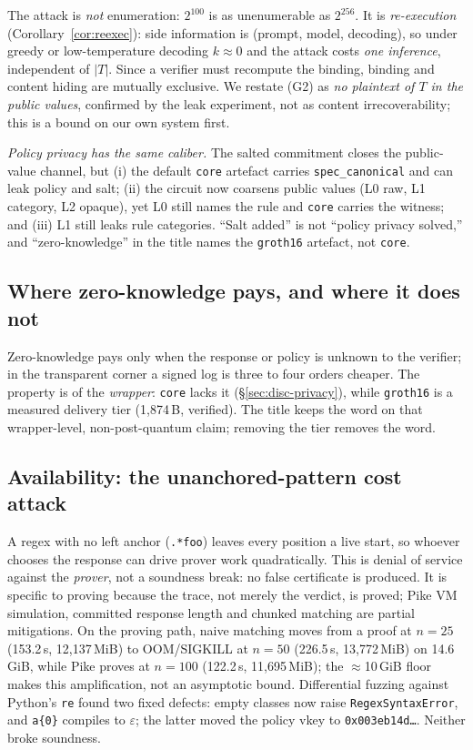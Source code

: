 \documentclass[10pt,journal,compsoc]{IEEEtran}
\begin{document}
The attack is \emph{not} enumeration: $2^{100}$ is as unenumerable as
$2^{256}$. It is \emph{re-execution} (Corollary~\ref{cor:reexec}): side
information is (prompt, model, decoding), so under greedy or low-temperature
decoding $k\approx0$ and the attack costs \emph{one inference}, independent of
$|T|$. Since a verifier must recompute the binding, binding and content hiding
are mutually exclusive. We restate (G2) as \emph{no plaintext of $T$ in the
public values}, confirmed by the leak experiment, not as content
irrecoverability; this is a bound on our own system first.

\emph{Policy privacy has the same caliber.} The salted commitment closes the
public-value channel, but (i) the default \texttt{core} artefact carries
\texttt{spec\_canonical} and can leak policy and salt; (ii) the circuit now
coarsens public values (L0 raw, L1 category, L2 opaque), yet L0 still names the
rule and \texttt{core} carries the witness; and (iii) L1 still leaks rule
categories. ``Salt added'' is not ``policy privacy solved,'' and
``zero-knowledge'' in the title names the \texttt{gr\-oth16} artefact, not
\texttt{core}.

\subsection{Where zero-knowledge pays, and where it does not}
\label{sec:disc-zkmap}

Zero-knowledge pays only when the response or policy is unknown to the
verifier; in the transparent corner a signed log is three to four orders
cheaper. The property is of the \emph{wrapper}: \texttt{core} lacks it
(\S\ref{sec:disc-privacy}), while \texttt{gr\-oth16} is a measured delivery
tier (1{,}874\,B, verified). The title keeps the word on that wrapper-level,
non-post-quantum claim; removing the tier removes the word.

\subsection{Availability: the unanchored-pattern cost attack}
\label{sec:disc-dos}

A regex with no left anchor (\texttt{.*foo}) leaves every position a live
start, so whoever chooses the response can drive prover work quadratically.
This is denial of service against the \emph{prover}, not a soundness break: no
false certificate is produced. It is specific to proving because the trace, not
merely the verdict, is proved; Pike VM simulation, committed response length and
chunked matching are partial mitigations. On the proving path, naive matching
moves from a proof at $n=25$
(153.2\,s, 12{,}137\,MiB) to OOM/SIGKILL at $n=50$ (226.5\,s, 13{,}772\,MiB)
on 14.6\,GiB, while Pike proves at $n=100$ (122.2\,s, 11{,}695\,MiB); the
$\approx$10\,GiB floor makes this amplification, not an asymptotic bound.
Differential fuzzing against Python's \texttt{re} found two fixed defects:
empty classes now raise \texttt{RegexSyntaxError}, and \texttt{a\{0\}} compiles
to $\varepsilon$; the latter moved the policy vkey to
\texttt{0x003eb14d\ldots}. Neither broke soundness.
\end{document}
